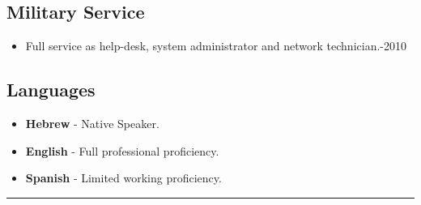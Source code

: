 \documentclass[11pt,a4paper]{article}
\begin{document}
	\subsection*{Military Service} 
	\begin{itemize}
		\item Full service as help-desk, system administrator and network technician.-2010
	\end{itemize}
	
	\subsection*{Languages}
	\begin{multicols}{3}
		\begin{itemize}
			\item \textbf{Hebrew} - Native Speaker.
			\item \textbf{English} - Full professional proficiency.
			\item \textbf{Spanish} - Limited working proficiency.
		\end{itemize}
	\end{multicols}
	
	\begin{center}
		\hrule
		
	\end{center}
\end{document}
